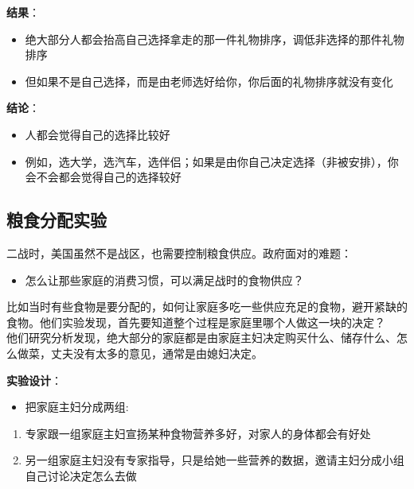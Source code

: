 \textbf{结果}：

\begin{itemize}
\tightlist
\item
  绝大部分人都会抬高自己选择拿走的那一件礼物排序，调低非选择的那件礼物排序
\item
  但如果不是自己选择，而是由老师选好给你，你后面的礼物排序就没有变化
\end{itemize}

\textbf{结论}：

\begin{itemize}
\tightlist
\item
  人都会觉得自己的选择比较好
\item
  例如，选大学，选汽车，选伴侣；如果是由你自己决定选择（非被安排），你会不会都会觉得自己的选择较好
\end{itemize}

\hypertarget{ux7caeux98dfux5206ux914dux5b9eux9a8c}{%
\subsection{粮食分配实验}\label{ux7caeux98dfux5206ux914dux5b9eux9a8c}}

二战时，美国虽然不是战区，也需要控制粮食供应。政府面对的难题：

\begin{itemize}
\tightlist
\item
  怎么让那些家庭的消费习惯，可以满足战时的食物供应？
\end{itemize}

比如当时有些食物是要分配的，如何让家庭多吃一些供应充足的食物，避开紧缺的食物。他们实验发现，首先要知道整个过程是家庭里哪个人做这一块的决定？\\
他们研究分析发现，绝大部分的家庭都是由家庭主妇决定购买什么、储存什么、怎么做菜，丈夫没有太多的意见，通常是由媳妇决定。

\textbf{实验设计}：

\begin{itemize}
\tightlist
\item
  把家庭主妇分成两组:
\end{itemize}

\begin{enumerate}
\tightlist
\item
  专家跟一组家庭主妇宣扬某种食物营养多好，对家人的身体都会有好处
\item
  另一组家庭主妇没有专家指导，只是给她一些营养的数据，邀请主妇分成小组自己讨论决定怎么去做\\
\end{enumerate}

